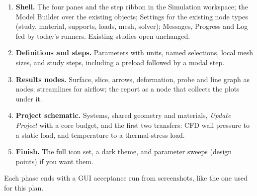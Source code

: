 \begin{enumerate}[nosep,label=P\arabic*.]
  \item \textbf{Shell.} The four panes and the step ribbon in the Simulation workspace; the Model Builder over the
        existing objects; Settings for the existing node types (study, material, supports, loads, mesh, solver);
        Messages, Progress and Log fed by today's runners. Existing studies open unchanged.
  \item \textbf{Definitions and steps.} Parameters with units, named selections, local mesh sizes, and study
        steps, including a preload followed by a modal step.
  \item \textbf{Results nodes.} Surface, slice, arrows, deformation, probe and line graph as nodes; streamlines
        for airflow; the report as a node that collects the plots under it.
  \item \textbf{Project schematic.} Systems, shared geometry and materials, \emph{Update Project} with a core
        budget, and the first two transfers: CFD wall pressure to a static load, and temperature to a thermal-stress
        load.
  \item \textbf{Finish.} The full icon set, a dark theme, and parameter sweeps (design points) if you want them.
\end{enumerate}
Each phase ends with a GUI acceptance run from screenshots, like the one used for this plan.

